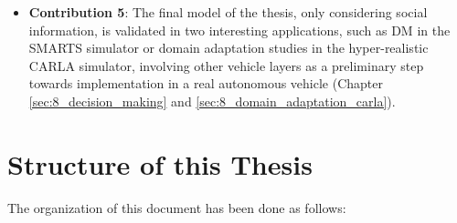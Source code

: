 \begin{itemize}
	\item \textbf{Contribution 5}: The final model of the thesis, only considering social information, is validated in two interesting applications, such as \ac{DM} in the SMARTS simulator or domain adaptation studies in the hyper-realistic CARLA simulator, involving other vehicle layers as a preliminary step towards implementation in a real autonomous vehicle (Chapter \ref{sec:8_decision_making} and \ref{sec:8_domain_adaptation_carla}). 
	 
\end{itemize}

\begin{comment}
In order to achieve the main scope, the following objectives will be met:

\begin{enumerate}
	
	\item Review of \ac{SOTA} \ac{MP}, focused on \ac{DL} and the \ac{AD} paradigm.
	
	\item Propose of several efficient \ac{MP} architectures, studying the progressive incorporation of \ac{DL} mechanisms and different sources of information and metadata, achieving \ac{SOTA} accuracy while reducing in millions of parameters previous models as well as inference time.
	
	\item Validate the proposed models in downstream applications, such as \ac{DM} or behaviour planning, taking into account former stages of the perception layer (detection and tracking) instead of static files (benchmarks) in hyper-realistic simulation, as a preliminary stage before implementing it in a real-world vehicle.
	
\end{enumerate}
\end{comment}

\section{Structure of this Thesis}
\label{sec:1_structure}

The organization of this document has been done as follows:

